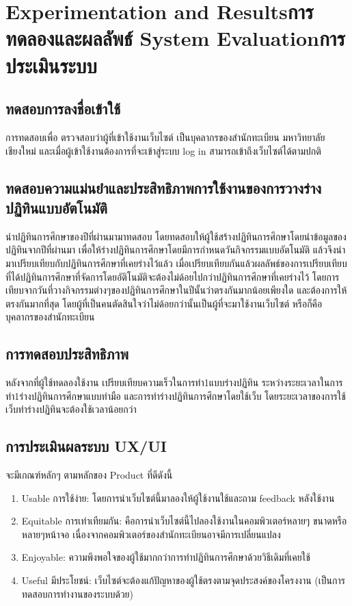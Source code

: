 \chapter{\ifproject%
\ifenglish Experimentation and Results\else การทดลองและผลลัพธ์\fi
\else%
\ifenglish System Evaluation\else การประเมินระบบ\fi
\fi}
\section{ทดสอบการลงชื่อเข้าใช้} 
   การทดสอบเพื่อ ตรวจสอบว่าผู้ที่เข้าใช้งานเว็บไซต์ เป็นบุคลากรของสำนักทะเบียน มหาวิทยาลัยเชียงใหม่ 
และเมื่อผู้เข้าใช้งานต้องการที่จะเข้าสู่ระบบ log in สามารถเข้าถึงเว็บไซต์ได้ตามปกติ

\section{ทดสอบความแม่นยำและประสิทธิภาพการใช้งานของการวางร่างปฏิทินแบบอัตโนมัติ}
   นำปฏิทินการศึกษาของปีที่ผ่านมามาทดสอบ โดยทดสอบให้ผู้ใช้สร้างปฏิทินการศึกษาโดยนำข้อมูลของปฏิทินจากปีที่ผ่านมา 
เพื่อให้ร่างปฏิทินการศึกษาโดยมีการกำหนดวันกิจกรรมแบบอัตโนมัติ แล้วจึงนำมาเปรียบเทียบกับปฏิทินการศึกษาที่เคยร่างไว้แล้ว 
เมื่อเปรียบเทียบกันแล้วผลลัพธ์ของการเปรียบเทียบที่ได้ปฏิทินการศึกษาที่จัดการโดยอัติโนมัติจะต้องไม่ด้อยไปกว่าปฏิทินการศึกษาที่เคยร่างไว้
โดยการเทียบจากวันที่วางกิจกรรมต่างๆของปฏิทินการศึกษาในปีนั้นว่าตรงกันมากน้อยเพียงใด และต้องการให้ตรงกันมากที่สุด
โดยผู้ที่เป็นคนตัดสินใจว่าไม่ด้อยกว่านั้นเป็นผู้ที่จะมาใช้งานเว็บไซต์ หรือก็คือบุคลากรของสำนักทะเบียน

\section{การทดสอบประสิทธิภาพ}
หลังจากที่ผู้ใช้ทดลองใช้งาน เปรียบเทียบความเร็วในการทำ1แบบร่างปฏิทิน ระหว่างระยะเวลาในการทำ1ร่างปฏิทินการศึกษาแบบทำมือ
และการทำร่างปฏิทินการศึกษาโดยใช้เว็บ โดยระยะเวลาของการใช้เว็บทำร่างปฏิทินจะต้องใช้เวลาน้อยกว่า

\section{การประเมินผลระบบ UX/UI } 
จะมีเกณฑ์หลักๆ ตามหลักของ Product ที่ดีดังนี้
\begin{enumerate}
   \item Usable การใช้ง่าย: โดยการนำเว็บไซต์นี้มาลองให้ผู้ใช้งานใช้และถาม feedback หลังใช้งาน
   \item Equitable การเท่าเทียมกัน: คือการนำเว็บไซต์นี้ไปลองใช้งานในคอมพิวเตอร์หลายๆ ขนาดหรือหลายๆหน้าจอ เนื่องจากคอมพิวเตอร์ของสำนักทะเบียนอาจมีการเปลี่ยนแปลง
   \item Enjoyable: ความพึงพอใจของผู้ใช้มากกว่าการทำปฏิทินการศึกษาด้วยวิธีเดิมที่เคยใช้
   \item Useful มีประโยชน์: เว็บไซต์จะต้องแก้ปัญหาของผู้ใช้ตรงตามจุดประสงค์ของโครงงาน (เป็นการทดสอบการทำงานของระบบด้วย)
\end{enumerate}